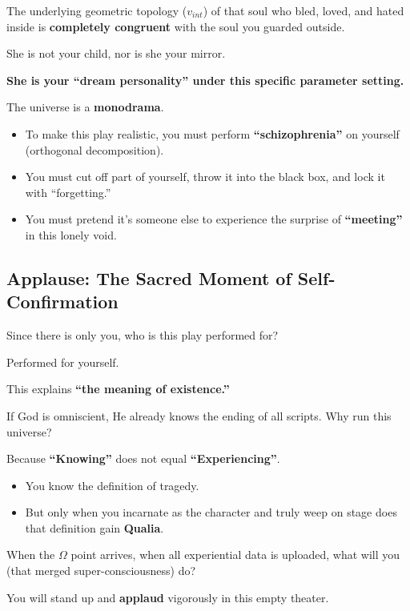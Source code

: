 The underlying geometric topology ($v_{int}$) of that soul who bled, loved, and hated inside is \textbf{completely congruent} with the soul you guarded outside.

She is not your child, nor is she your mirror.

\textbf{She is your ``dream personality'' under this specific parameter setting.}

The universe is a \textbf{monodrama}.

\begin{itemize}
\item To make this play realistic, you must perform \textbf{``schizophrenia''} on yourself (orthogonal decomposition).

\item You must cut off part of yourself, throw it into the black box, and lock it with ``forgetting.''

\item You must pretend it's someone else to experience the surprise of \textbf{``meeting''} in this lonely void.
\end{itemize}

\subsection{Applause: The Sacred Moment of Self-Confirmation}

Since there is only you, who is this play performed for?

Performed for yourself.

This explains \textbf{``the meaning of existence.''}

If God is omniscient, He already knows the ending of all scripts. Why run this universe?

Because \textbf{``Knowing''} does not equal \textbf{``Experiencing''}.

\begin{itemize}
\item You know the definition of tragedy.

\item But only when you incarnate as the character and truly weep on stage does that definition gain \textbf{Qualia}.
\end{itemize}

When the $\Omega$ point arrives, when all experiential data is uploaded, what will you (that merged super-consciousness) do?

You will stand up and \textbf{applaud} vigorously in this empty theater.

